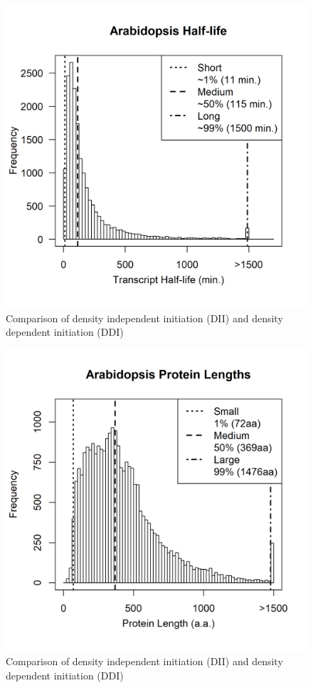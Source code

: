 \documentclass[review]{elsarticle}
\begin{document}
\begin{figure}[ht]
\centering
\includegraphics[width=\textwidth/2]{Images/Figure1_At_Transcript_half_life_histogram.png}
\caption{Comparison of density independent initiation (DII) and density dependent initiation (DDI)}
\end{figure}

\begin{figure}[ht]
\centering
\includegraphics[width=\textwidth/2]{Images/Figure1_At_Protein_length_histogram.png}
\caption{Comparison of density independent initiation (DII) and density dependent initiation (DDI)}
\end{figure}
\end{document}
